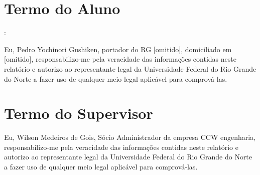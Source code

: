 
\section{Termo do Aluno}:


Eu, Pedro Yochinori Gushiken, portador do RG [omitido], domiciliado em [omitido], responsabilizo-me pela veracidade das informações contidas neste relatório e autorizo ao representante legal da Universidade Federal do Rio 
	Grande do Norte a fazer uso de qualquer meio legal aplicável para comprová-las.

	\section{Termo do Supervisor}
	
	Eu, Wilson Medeiros de Gois, Sócio Administrador da empresa CCW engenharia, responsabilizo-me pela veracidade das informações contidas neste 
relatório e autorizo ao representante legal da Universidade Federal do Rio 
	Grande do Norte a fazer uso de qualquer meio legal aplicável para comprová-las.

	